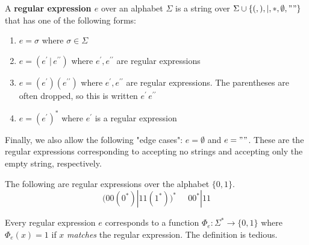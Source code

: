   \begin{definition}
  A \textbf{regular expression $e$} over an alphabet $\Sigma$ is a string over $\Sigma \cup \{(, ), |, *, \emptyset, ""\}$ that has one of the following forms: 
  \begin{enumerate}
      \item $e = \sigma$ where $\sigma \in \Sigma$ 
      \item $e = (e^\prime \,|\, e^{\prime\prime})$ where $e^\prime, e^{\prime\prime}$ are regular expressions
      \item $e = (e^\prime)(e^{\prime\prime})$ where $e^\prime, e^{\prime\prime}$ are regular expressions. The parentheses are often dropped, so this is written $e^\prime \, e^{\prime\prime}$
      \item $e = (e^\prime)^*$ where $e^\prime$ is a regular expression
  \end{enumerate}
  Finally, we also allow the following "edge cases": $e = \emptyset$ and $e = ""$. These are the regular expressions corresponding to accepting no strings and accepting only the empty string, respectively. 
  \end{definition}

  \begin{example}
  The following are regular expressions over the alphabet $\{0,1\}$. 
  \[\big( 00(0^*)|11(1^*)\big)^* \;\;\;\;\; 00^*|11\]
  \end{example}

  Every regular expression $e$ corresponds to a function $\Phi_e : \Sigma^* \longrightarrow \{0,1\}$ where $\Phi_e (x) = 1$ if $x$ \textit{matches} the regular expression. The definition is tedious. 

